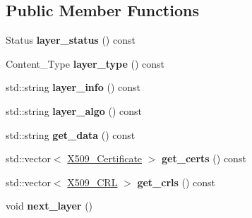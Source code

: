 \subsection*{Public Member Functions}
\begin{DoxyCompactItemize}
\item 
\hypertarget{classBotan_1_1CMS__Decoder_a2493f713e9a06b5d0a7e4379ef25915d}{Status {\bfseries layer\-\_\-status} () const }\label{classBotan_1_1CMS__Decoder_a2493f713e9a06b5d0a7e4379ef25915d}

\item 
\hypertarget{classBotan_1_1CMS__Decoder_a2e6ff4f506a0d02ce9ef8c44514bd225}{Content\-\_\-\-Type {\bfseries layer\-\_\-type} () const }\label{classBotan_1_1CMS__Decoder_a2e6ff4f506a0d02ce9ef8c44514bd225}

\item 
\hypertarget{classBotan_1_1CMS__Decoder_aa56176a6a99fea10b9eab115d01caf51}{std\-::string {\bfseries layer\-\_\-info} () const }\label{classBotan_1_1CMS__Decoder_aa56176a6a99fea10b9eab115d01caf51}

\item 
\hypertarget{classBotan_1_1CMS__Decoder_aa335cde506f904c58f88de3fbe56b541}{std\-::string {\bfseries layer\-\_\-algo} () const }\label{classBotan_1_1CMS__Decoder_aa335cde506f904c58f88de3fbe56b541}

\item 
\hypertarget{classBotan_1_1CMS__Decoder_a59875322905fd4e29e14081af1d25db3}{std\-::string {\bfseries get\-\_\-data} () const }\label{classBotan_1_1CMS__Decoder_a59875322905fd4e29e14081af1d25db3}

\item 
\hypertarget{classBotan_1_1CMS__Decoder_aac844596b4e9520d87e55d739d57bf44}{std\-::vector$<$ \hyperlink{classBotan_1_1X509__Certificate}{X509\-\_\-\-Certificate} $>$ {\bfseries get\-\_\-certs} () const }\label{classBotan_1_1CMS__Decoder_aac844596b4e9520d87e55d739d57bf44}

\item 
\hypertarget{classBotan_1_1CMS__Decoder_afc568ce38a9590926b303c9d6f705266}{std\-::vector$<$ \hyperlink{classBotan_1_1X509__CRL}{X509\-\_\-\-C\-R\-L} $>$ {\bfseries get\-\_\-crls} () const }\label{classBotan_1_1CMS__Decoder_afc568ce38a9590926b303c9d6f705266}

\item 
\hypertarget{classBotan_1_1CMS__Decoder_a84aca2e7fbc81cb436fc0aa7bdae6235}{void {\bfseries next\-\_\-layer} ()}\label{classBotan_1_1CMS__Decoder_a84aca2e7fbc81cb436fc0aa7bdae6235}


\end{DoxyCompactItemize}
